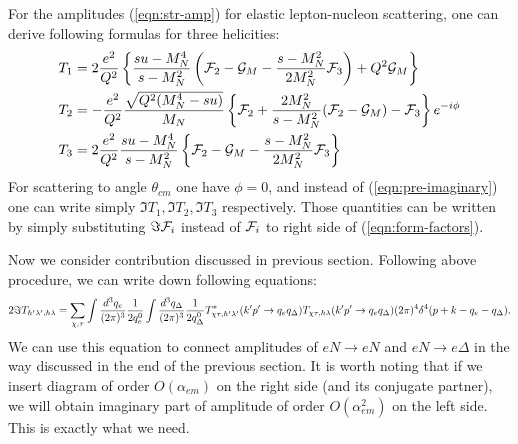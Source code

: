 \documentclass[12pt]{revtex4-1}
\newcommand{\cG}{{\cal G}}
\newcommand{\cF}{{\cal F}}
\begin{document}
	For the amplitudes (\ref{eqn:str-amp}) for elastic lepton-nucleon scattering,
	one can derive following formulas for three helicities:
	\begin{align}\label{eqn:form-factors}
		T_1 & = 2 \frac{e^2}{Q^2} \left\{ \frac{s u - M_N^4}{s - M_N^2}
		\left( \cF_2 - \cG_M - \frac{s - M_N^2}{2 M_N^2} \cF_3 \right) + Q^2 \cG_M
		\right\}
		\nonumber
		\\
		T_2 & = - \frac{e^2}{Q^2} \frac{\sqrt{Q^2(M_N^4 - s u)}}{M_N} \left\{
		\cF_2 + \frac{2 M_N^2}{s - M_N^2} (\cF_2 - \cG_M) - \cF_3
		\right\} e^{-i \phi}
		\nonumber
		\\
		T_3 & = 2 \frac{e^2}{Q^2} \frac{s u - M_N^4}{s - M_N^2}\left\{
		\cF_2 - \cG_M - \frac{s - M_N^2}{2 M_N^2} \cF_3 \right\}
	\end{align}
	For scattering to angle $\theta_{cm}$ one have $\phi = 0$, and instead of
	(\ref{eqn:pre-imaginary}) one can write simply $\Im T_1, \Im T_2, \Im T_3$
	respectively. Those quantities can be written by simply substituting $\Im \cF_i$
	instead of $\cF_i$ to right side of (\ref{eqn:form-factors}).
	
	Now we consider contribution discussed in previous section. Following above
	procedure, we can write down following equations:
	\begin{equation}\label{eqn:optical-diags}
	 2 \Im T_{h' \lambda', h \lambda}  =
	 \sum_{\chi, \tau} \int \frac{d^3 q_e}{(2 \pi)^3} \frac{1}{2 q^0_e}
	 \int \frac{d^3 q_\Delta}{(2 \pi)^3} \frac{1}{2 q^0_\Delta}
	 T^{*}_{\chi \tau , h' \lambda'}(k' p' \to q_e q_\Delta)
	 T_{\chi \tau, h \lambda}(k' p' \to q_e q_\Delta)
	 (2 \pi)^4 \delta^4 (p+k-q_e - q_\Delta).
	 \\ 
	\end{equation}
	We can use this equation to connect amplitudes of $eN \to eN$ and $eN \to e \Delta$
	in the way discussed in the end of the previous section. It is worth noting that
	if we insert diagram of order $O(\alpha_{em})$ on the right side (and its conjugate
	partner), we will obtain imaginary part of amplitude of order $O(\alpha_{em}^2)$
	on the left side. This is exactly what we need.
	
\end{document}
